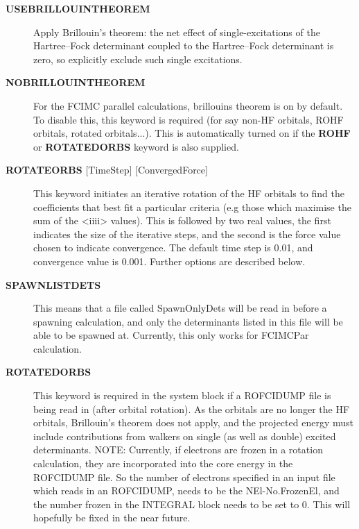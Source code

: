 \documentclass[openany,a4paper,10pt,english]{manual}
\begin{document}
\begin{description}
\item[\textbf{USEBRILLOUINTHEOREM}] \leavevmode
Apply Brillouin's theorem: the net effect of single-excitations of
the Hartree--Fock determinant coupled to the Hartree--Fock determinant
is zero, so explicitly exclude such single excitations.

\item[\textbf{NOBRILLOUINTHEOREM}] \leavevmode
For the FCIMC parallel calculations, brillouins theorem is on by default. To disable
this, this keyword is required (for say non-HF orbitals, ROHF orbitals, rotated orbitals...).
This is automatically turned on if the \textbf{ROHF} or \textbf{ROTATEDORBS} keyword is
also supplied.

\item[\textbf{ROTATEORBS} {[}TimeStep{]} {[}ConvergedForce{]}] \leavevmode
This keyword initiates an iterative rotation of the HF orbitals to find the
coefficients that best fit a particular criteria (e.g those which maximise
the sum of the \textless{}ii\textbar{}ii\textgreater{} values).
This is followed by two real values, the first indicates the size of the
iterative steps, and the second is the force value chosen to indicate convergence.
The default time step is 0.01, and convergence value is 0.001.
Further options are described below.

\item[\textbf{SPAWNLISTDETS}] \leavevmode
This means that a file called SpawnOnlyDets will be read in before a spawning calculation,
and only the determinants listed in this file will be able to be spawned at. Currently,
this only works for FCIMCPar calculation.

\item[\textbf{ROTATEDORBS}] \leavevmode
This keyword is required in the system block if a ROFCIDUMP file is being read in
(after orbital rotation).  As the orbitals are no longer the HF orbitals, Brillouin's
theorem does not apply, and the projected energy must include contributions from
walkers on single (as well as double) excited determinants.
NOTE: Currently, if electrons are frozen in a rotation calculation, they are
incorporated into the core energy in the ROFCIDUMP file.  So the number of electrons
specified in an input file which reads in an ROFCIDUMP, needs to be the NEl-No.FrozenEl,
and the number frozen in the INTEGRAL block needs to be set to 0.
This will hopefully be fixed in the near future.


\end{description}
\end{document}
